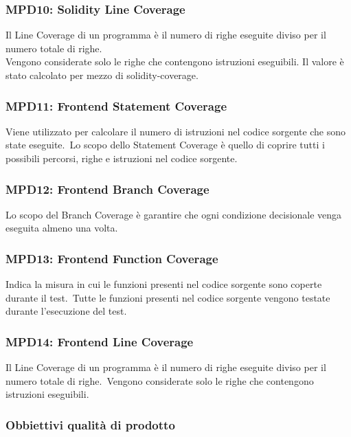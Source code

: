 \subsubsection{MPD10: Solidity Line Coverage}\label{sssec:solidity_line_coverage}
Il Line Coverage di un programma è il numero di righe eseguite diviso per il numero totale di righe.\\
Vengono considerate solo le righe che contengono istruzioni eseguibili.
Il valore è stato calcolato per mezzo di solidity-coverage.
\subsubsection{MPD11: Frontend Statement Coverage}\label{sssec:frontend_statement_coverage}
Viene utilizzato per calcolare il numero di istruzioni nel codice sorgente che sono state eseguite.\
Lo scopo dello Statement Coverage è quello di coprire tutti i possibili percorsi, righe e istruzioni nel codice sorgente.\


\subsubsection{MPD12: Frontend Branch Coverage}\label{sssec:frontend_branch_coverage}
Lo scopo del Branch Coverage è garantire che ogni condizione decisionale venga eseguita almeno una volta.\


\subsubsection{MPD13: Frontend Function Coverage}\label{sssec:frontend_function_coverage}
Indica la misura in cui le funzioni presenti nel codice sorgente sono coperte durante il test.\
Tutte le funzioni presenti nel codice sorgente vengono testate durante l'esecuzione del test.\


\subsubsection{MPD14: Frontend Line Coverage}\label{sssec:frontend_line_coverage}
Il Line Coverage di un programma è il numero di righe eseguite diviso per il numero totale di righe.\
Vengono considerate solo le righe che contengono istruzioni eseguibili.

\subsubsection{Obbiettivi qualità di prodotto}

